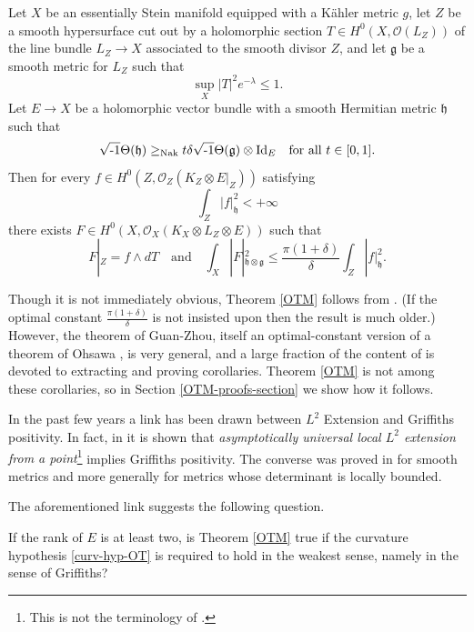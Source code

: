 \documentclass[12pt,hidelinks]{amsart}
\newcommand{\cO}{{\mathcal O}}
\newcommand{\fg}{{\mathfrak g}}
\newcommand{\fh}{{\mathfrak h}}
\newcommand{\ii}{\sqrt{\text{\rm -}1}}
\newcommand{\tensor}{\otimes}
\begin{document}
\begin{thm}\label{OTM}
Let $X$ be an essentially Stein manifold equipped with a K\"ahler metric $g$, let $Z$ be a smooth hypersurface cut out by a holomorphic section $T \in H^0(X, \cO (L_Z))$ of the line bundle $L_Z \to X$ associated to the smooth divisor $Z$, and let $\fg$ be a smooth metric for $L_Z$ such that 
\[
\sup _X |T|^2 e^{-\lambda} \le 1.
\]
Let $E \to X$ be a holomorphic vector bundle with a smooth Hermitian metric $\fh$ such that 
\begin{equation}\label{curv-hyp-OT}
\ii \Theta (\fh) \ge_{\rm Nak} t \delta \ii \Theta (\fg)\tensor {\rm Id}_E \quad \text{for all }t \in [0,1].
\end{equation}
Then for every $f \in H^0(Z, \cO_Z (K_Z \tensor E|_{Z}))$ satisfying
\[
\int _Z |f|^2_{\fh} < +\infty
\]
there exists $F \in H^0(X, \cO _X(K_X \tensor L_Z \tensor E))$ such that 
\[
F|_Z = f\wedge dT  \quad \text{and} \quad \int _X |F|^2_{\fh\tensor \fg} \le \frac{\pi (1+\delta)}{\delta} \int _Z |f|^2_{\fh} .
\]
\end{thm}

Though it is not immediately obvious, Theorem \ref{OTM} follows from \cite[Theorem 2.1]{gz}.  (If the optimal constant $\frac{\pi(1+\delta)}{\delta}$ is not insisted upon then the result is much older.)  However, the theorem of Guan-Zhou, itself an optimal-constant version of a theorem of Ohsawa \cite[Theorem 4]{o5}, is very general, and a large fraction of the content of \cite{gz} is devoted to extracting and proving corollaries.  Theorem \ref{OTM} is not among these corollaries, so in Section \ref{OTM-proofs-section} we show how it follows.  

In the past few years a link has been drawn between $L^2$ Extension and Griffiths positivity.  In fact, in \cite{dnwz} it is shown that \emph{asymptotically universal local $L^2$ extension from a point}\footnote{This is not the  terminology of \cite{dnwz}.} implies Griffiths positivity.  The converse was proved in \cite{kp} for smooth metrics and more generally for metrics whose determinant is locally bounded.

The aforementioned link suggests the following question.

\begin{s-qn}
If the rank of $E$ is at least two, is Theorem \ref{OTM} true if the curvature hypothesis \eqref{curv-hyp-OT} is required to hold in the weakest sense, namely in the sense of Griffiths? 
\end{s-qn}
\end{document}
